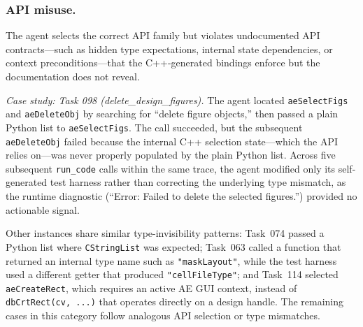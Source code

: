 \subsubsection{API misuse.}

The agent selects the correct API family but violates undocumented API contracts—such as hidden type expectations, internal state dependencies, or context preconditions—that the C++-generated bindings enforce but the documentation does not reveal.

\textit{Case study: Task 098 (delete\_design\_figures).} The agent located \texttt{aeSelectFigs} and \texttt{aeDeleteObj} by searching for ``delete figure objects,'' then passed a plain Python list to \texttt{aeSelectFigs}. The call succeeded, but the subsequent \texttt{aeDeleteObj} failed because the internal C++ selection state—which the API relies on—was never properly populated by the plain Python list. Across five subsequent \texttt{run\_code} calls within the same trace,
the agent modified only its self-generated test harness rather than
correcting the underlying type mismatch, as the runtime diagnostic
(``Error: Failed to delete the selected figures.'') provided no
actionable signal.

Other instances share similar type-invisibility patterns: Task~074 passed 
a Python list where \texttt{CStringList} was expected; Task~063 called a 
function that returned an internal type name such as \texttt{"maskLayout"}, 
while the test harness used a different getter that produced 
\texttt{"cellFileType"}; and Task~114 selected \texttt{aeCreateRect}, which 
requires an active AE GUI context, instead of \texttt{dbCrtRect(cv, ...)} 
that operates directly on a design handle. The remaining cases in this 
category follow analogous API selection or type mismatches.

